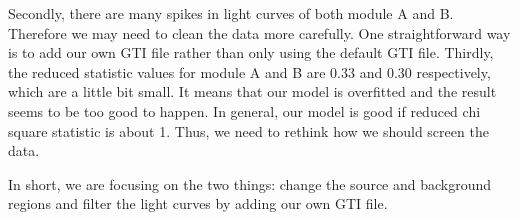\documentclass[12pt]{report}
\begin{document}
        \indent Secondly, there are many spikes in light curves of both module A and B. 
        Therefore we may need to clean the data
        more carefully. One straightforward way is to add our own GTI file rather than only using the default GTI 
        file. Thirdly, the reduced statistic values for module A and B are 0.33 and 0.30 respectively, which are 
        a little bit small. It means that our model is overfitted and the result seems to be too good to happen. In 
        general, our model is good if reduced chi square statistic is about 1. Thus, we need to rethink how we 
        should screen the data.

        \indent 
        In short, we are focusing on the two things: change the source and background regions and filter the 
        light curves by adding our own GTI file. 
\end{document}
